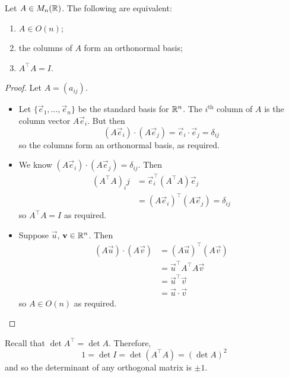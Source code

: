\documentclass{../../template/note}
\begin{document}
    \begin{lemma}[Matrices in \(O(n)\)]
        Let \(A \in M_n(\mathbb R)\). The following are equivalent:
        \begin{enumerate}[label=\protect\circled{\arabic*}]
            \item \(A \in O(n)\);
            \item the columns of \(A\) form an orthonormal basis;
            \item \(A^\intercal A = I\).
        \end{enumerate}
    \end{lemma}
    
    \begin{proof}
        Let \(A = (a_{ij})\).
        \begin{itemize}[leftmargin=60px]
            \item[(\(1 \implies 2\))] Let \(\{\vec e_1, \dots, \vec e_n\}\) be the standard basis for \(\mathbb R^n\). The \(i^\text{th}\) column of \(A\) is the column vector \(A\vec e_i\). But then
            \[
                (A \vec e_i) \cdot (A \vec e_j) = \vec e_i \cdot \vec e_j = \delta_{ij}
            \]
            so the columns form an orthonormal basis, as required.
            \item[(\(2 \implies 3\))] We know \((A\vec e_i) \cdot (A \vec e_j) = \delta_{ij}\). Then
            \begin{align*}
                (A^\intercal A)_ij &= \vec e_i^\intercal (A^\intercal A) \vec e_j \\
                &= (A \vec e_i)^\intercal (A \vec e_j) = \delta_{ij}
            \end{align*}
            so \(A^\intercal A = I\) as required. \\
            \item[(\(3 \implies 1\))] Suppose \(\vec u\), \(\vec v \in \RR^n\). Then
            \begin{align*}
                (A \vec u) \cdot (A \vec v) &= (A \vec u)^\intercal (A \vec v) \\
                &= \vec u^\intercal A^\intercal A \vec v \\
                &= \vec u^\intercal \vec v \\
                &= \vec u \cdot \vec v
            \end{align*}
            so \(A \in O(n)\) as required.            
        \end{itemize}
    \end{proof}
    Recall that \(\det A^\intercal = \det A\). Therefore,
    \[
        1 = \det I = \det (A^\intercal A) = (\det A)^2
    \]
    and so the determinant of any orthogonal matrix is \(\pm 1\).
\end{document}
